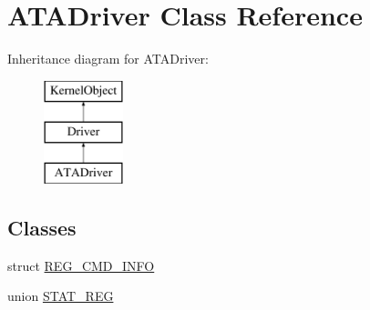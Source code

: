\hypertarget{class_a_t_a_driver}{}\section{A\+T\+A\+Driver Class Reference}
\label{class_a_t_a_driver}
Inheritance diagram for A\+T\+A\+Driver\+:\begin{figure}[H]
\begin{center}
\leavevmode
\includegraphics[height=3.000000cm]{class_a_t_a_driver}
\end{center}
\end{figure}
\subsection*{Classes}
\begin{DoxyCompactItemize}
\item 
struct \hyperlink{struct_a_t_a_driver_1_1_r_e_g___c_m_d___i_n_f_o}{R\+E\+G\+\_\+\+C\+M\+D\+\_\+\+I\+N\+FO}
\item 
union \hyperlink{union_a_t_a_driver_1_1_s_t_a_t___r_e_g}{S\+T\+A\+T\+\_\+\+R\+EG}
\end{DoxyCompactItemize}
